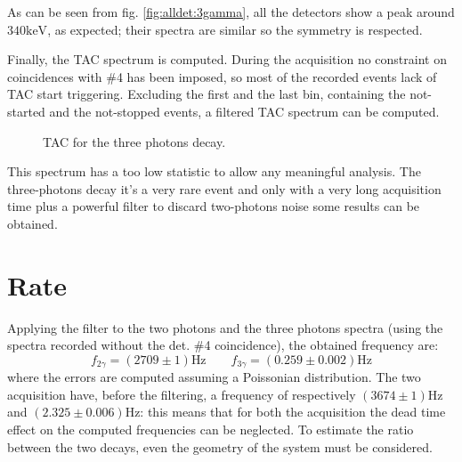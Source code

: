 \documentclass[11pt,a4 paper]{article}
\begin{document}
As can be seen from fig. \ref{fig:alldet:3gamma}, all the detectors show a peak around $340\si{\kilo\electronvolt}$, as expected; their spectra are similar so the symmetry is respected.

Finally, the TAC spectrum is computed. During the acquisition no constraint on coincidences with \#4 has been imposed, so most of the recorded events lack of TAC start triggering. Excluding the first and the last bin, containing the not-started and the not-stopped events, a filtered TAC spectrum can be computed.

\begin{figure}[H]
    \centering
    \caption{TAC for the three photons decay.}
    \label{fig:tac:3gamma}
\end{figure}


This spectrum has a too low statistic to allow any meaningful analysis. The three-photons decay it's a very rare event and only with a very long acquisition time plus a powerful filter to discard two-photons noise some results can be obtained.


\section{Rate}

Applying the filter to the two photons and the three photons spectra (using the spectra recorded without the det. \#4 coincidence), the obtained frequency are:
\begin{equation}
    f_{2\gamma} = (2709 \pm 1)\si{\hertz} \qquad f_{3\gamma} = (0.259 \pm 0.002)\si{\hertz}
\end{equation}
where the errors are computed assuming a Poissonian distribution. The two acquisition have, before the filtering, a frequency of respectively $(3674\pm1)\si{\hertz}$ and $(2.325\pm0.006)\si{\hertz}$: this means that for both the acquisition the dead time effect on the computed frequencies can be neglected. To estimate the ratio between the two decays, even the geometry of the system must be considered.
\end{document}
